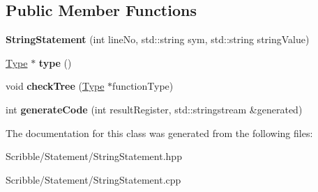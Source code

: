 \subsection*{Public Member Functions}
\begin{DoxyCompactItemize}
\item 
\hypertarget{class_string_statement_a473700f2ff24ebce6cc19483c371935e}{{\bfseries String\-Statement} (int line\-No, std\-::string sym, std\-::string string\-Value)}\label{class_string_statement_a473700f2ff24ebce6cc19483c371935e}

\item 
\hypertarget{class_string_statement_a444be1cd0d4e21592249fdd8350edc00}{\hyperlink{class_type}{Type} $\ast$ {\bfseries type} ()}\label{class_string_statement_a444be1cd0d4e21592249fdd8350edc00}

\item 
\hypertarget{class_string_statement_a012fea8af23a7740e05eb7af42082b70}{void {\bfseries check\-Tree} (\hyperlink{class_type}{Type} $\ast$function\-Type)}\label{class_string_statement_a012fea8af23a7740e05eb7af42082b70}

\item 
\hypertarget{class_string_statement_aacb8f784caee9698087ab362bc9881ab}{int {\bfseries generate\-Code} (int result\-Register, std\-::stringstream \&generated)}\label{class_string_statement_aacb8f784caee9698087ab362bc9881ab}

\end{DoxyCompactItemize}


The documentation for this class was generated from the following files\-:\begin{DoxyCompactItemize}
\item 
Scribble/\-Statement/String\-Statement.\-hpp\item 
Scribble/\-Statement/String\-Statement.\-cpp\end{DoxyCompactItemize}

